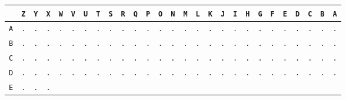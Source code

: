 \begin{figure}[H]
  \begin{center}
    \scalebox{0.5} {
      \begin{tabular}{c|cccccccccccccccccccccccccc}
        & \texttt{Z} & \texttt{Y} & \texttt{X} & \texttt{W} &
        \texttt{V} & \texttt{U} & \texttt{T} & \texttt{S} &
        \texttt{R} & \texttt{Q} & \texttt{P} & \texttt{O} &
        \texttt{N} & \texttt{M} & \texttt{L} & \texttt{K} &
        \texttt{J} & \texttt{I} & \texttt{H} & \texttt{G} &
        \texttt{F} & \texttt{E} & \texttt{D} & \texttt{C} &
        \texttt{B} & \texttt{A}
        \\ \hline
        \texttt{A} & \texttt{.} & \texttt{.} & \texttt{.} &
        \texttt{.} & \texttt{.} & \texttt{.} & \texttt{.} &
        \texttt{.} & \texttt{.} & \texttt{.} & \texttt{.} &
        \texttt{.} & \texttt{.} & \texttt{.} & \texttt{.} &
        \texttt{.} & \texttt{.} & \texttt{.} & \texttt{.} &
        \texttt{.} & \texttt{.} & \texttt{.} & \texttt{.} &
        \texttt{.} & \texttt{.} & \texttt{.}                             \\
        \texttt{B} & \texttt{.} & \texttt{.} & \texttt{.} &
        \texttt{.} & \texttt{.} & \texttt{.} & \texttt{.} &
        \texttt{.} & \texttt{.} & \texttt{.} & \texttt{.} &
        \texttt{.} & \texttt{.} & \texttt{.} & \texttt{.} &
        \texttt{.} & \texttt{.} & \texttt{.} & \texttt{.} &
        \texttt{.} & \texttt{.} & \texttt{.} & \texttt{.} &
        \texttt{.} & \texttt{.} & \texttt{.}                             \\
        \texttt{C} & \texttt{.} & \texttt{.} & \texttt{.} &
        \texttt{.} & \texttt{.} & \texttt{.} & \texttt{.} &
        \texttt{.} & \texttt{.} & \texttt{.} & \texttt{.} &
        \texttt{.} & \texttt{.} & \texttt{.} & \texttt{.} &
        \texttt{.} & \texttt{.} & \texttt{.} & \texttt{.} &
        \texttt{.} & \texttt{.} & \texttt{.} & \texttt{.} &
        \texttt{.} & \texttt{.} & \texttt{.}                             \\
        \texttt{D} & \texttt{.} & \texttt{.} & \texttt{.} &
        \texttt{.} & \texttt{.} & \texttt{.} & \texttt{.} &
        \texttt{.} & \texttt{.} & \texttt{.} & \texttt{.} &
        \texttt{.} & \texttt{.} & \texttt{.} & \texttt{.} &
        \texttt{.} & \texttt{.} & \texttt{.} & \texttt{.} &
        \texttt{.} & \texttt{.} & \texttt{.} & \texttt{.} &
        \texttt{.} & \texttt{.} & \texttt{.}                             \\
        \texttt{E} & \texttt{.} & \texttt{.} & \texttt{.} &

\end{tabular}}
\end{center}
\end{figure}
